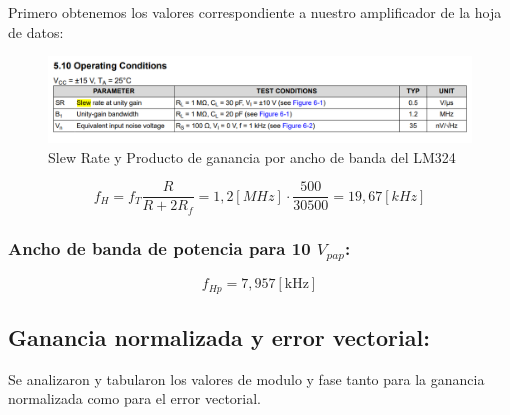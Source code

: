  Primero obtenemos los valores correspondiente a nuestro amplificador de la hoja de datos:

\begin{figure}[h!]
    \centering
    \includegraphics[width=1\linewidth]{img/slewrate_bgw.png}
    \caption{Slew Rate y Producto de ganancia por ancho de banda del LM324}
    \label{fig:slew_rate}
\end{figure}

\[ f_H = f_{T} \frac{R}{R+2 R_f} = 1,2 [MHz] \cdot \frac{500}{30500} = 19,67 [kHz] \]

\subsubsection{Ancho de banda de potencia para 10 $V_{pap}$:}
\[ f_{Hp}=7,957[\mathrm{kHz}] \]


  
 
\subsection { Ganancia normalizada y error vectorial:}
Se analizaron y tabularon los valores de modulo y fase tanto para la ganancia normalizada como para el error vectorial.

